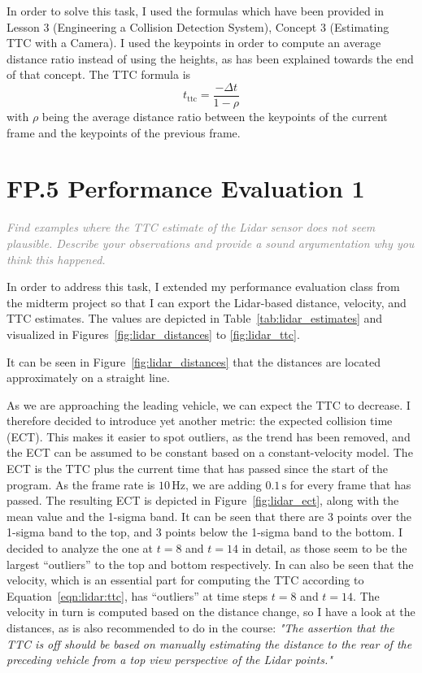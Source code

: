 \documentclass[a4paper]{scrartcl}
\begin{document}
In order to solve this task, I used the formulas
which have been provided in Lesson 3
(Engineering a Collision Detection System),
Concept 3 (Estimating TTC with a Camera).
I used the keypoints in order to compute an
average distance ratio instead of using the heights,
as has been explained towards the end of that concept.
The TTC formula is
\begin{equation}
	t_\text{ttc} = \frac{- \Delta t}{1 - \rho}
\end{equation}
with $\rho$ being the average distance ratio
between the keypoints of the current frame
and the keypoints of the previous frame.

\section*{FP.5 Performance Evaluation 1}
\textcolor{gray}{\textit{Find examples where the TTC estimate of the Lidar sensor does not seem plausible. Describe your observations and provide a sound argumentation why you think this happened.}}

In order to address this task, I extended my performance evaluation class
from the midterm project so that I can export the Lidar-based distance, velocity,
and TTC estimates.
The values are depicted in Table~\ref{tab:lidar_estimates} and visualized in
Figures~\ref{fig:lidar_distances} to \ref{fig:lidar_ttc}.

It can be seen in Figure~\ref{fig:lidar_distances} that the distances
are located approximately on a straight line.

As we are approaching the leading vehicle, we can expect the TTC to decrease.
I therefore decided to introduce yet another metric: the expected collision time (ECT).
This makes it easier to spot outliers, as the trend has been removed, and
the ECT can be assumed to be constant based on a constant-velocity model.
The ECT is the TTC plus the current time that has passed since the start
of the program. As the frame rate is $10\,\text{Hz}$, we are adding $0.1\,\text{s}$
for every frame that has passed.
The resulting ECT is depicted in Figure~\ref{fig:lidar_ect}, along with the mean
value and the 1-sigma band.
It can be seen that there are 3 points over the 1-sigma band
to the top, and 3 points below the 1-sigma band to the bottom.
I decided to analyze the one at $t=8$ and $t=14$
in detail, as those seem to be the largest ``outliers'' to the top and bottom
respectively.
In can also be seen that the velocity, which is an
essential part for computing the TTC
according to Equation~\ref{eqn:lidar:ttc}, has ``outliers''
at time steps $t=8$ and $t=14$.
The velocity in turn is computed based on the distance
change, so I have a look at the distances, as is also
recommended to do in the course:
\textit{"The assertion that the TTC is off should be based on manually estimating the distance to the rear of the preceding vehicle from a top view perspective of the Lidar points."}
\end{document}
